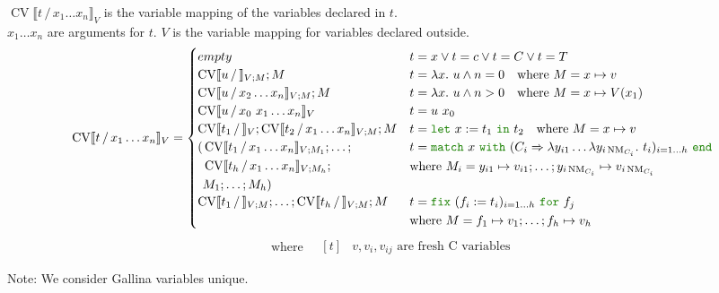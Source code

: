 \documentclass[a4paper,fleqn]{article}
\def\gallina{\textrm{Gallina}}
\newcommand{\kwlet}{\mbox{\color{mygreen}\ttfamily let}}
\newcommand{\kwin}{\mbox{\color{mygreen}\ttfamily in}}
\newcommand{\kwmatch}{\mbox{\color{mygreen}\ttfamily match}}
\newcommand{\kwwith}{\mbox{\color{mygreen}\ttfamily with}}
\newcommand{\kwend}{\mbox{\color{mygreen}\ttfamily end}}
\newcommand{\kwfix}{\mbox{\color{mygreen}\ttfamily fix}}
\newcommand{\kwfor}{\mbox{\color{mygreen}\ttfamily for}}
\newcommand{\lam}[2]{\lambda #1.~#2}
\newcommand{\lamB}[1]{\lambda #1.~}
\newcommand{\letin}[3]{\kwlet~#1:=#2~\kwin~#3}
\newcommand{\match}[4]{\kwmatch~#1~\kwwith~(#2 \Rightarrow #3)_{#4}~\kwend}
\newcommand{\fix}[4]{\kwfix~(#1 := #2)_{#3}~\kwfor~#4}
\DeclareMathOperator{\NM}{NM}
\newcommand{\BRA}[1]{\llbracket #1 \rrbracket}
\DeclareMathOperator{\cvop}{CV}
\newcommand{\cv}[3]{\cvop\BRA{#1\,/\,#2}_{#3}}
\begin{document}
\raggedright
$\cv{t}{x_1\dots x_n}{V}$ is the variable mapping of the variables declared in $t$. \\
$x_1\dots x_n$ are arguments for $t$.
$V$ is the variable mapping for variables declared outside.
\[
  \cv{t}{x_1\dots x_n}{V} =
  \begin{cases}
    empty                                             & t = x \vee t = c \vee t = C \vee t = T \\
    \cv{u}{}{V; M}; M                                & t = \lam{x}{u} \wedge n = 0 \quad \text{where}~M = x\mapsto v \\
    \cv{u}{x_2\dots x_n}{V; M}; M                    & t = \lam{x}{u} \wedge n > 0 \quad \text{where}~M = x\mapsto V(x_1) \\
    \cv{u}{x_0~x_1\dots x_n}V                        & t = u~x_0 \\
    \cv{t_1}{}{V}; \cv{t_2}{x_1\dots x_n}{V; M}; M    & t = \letin{x}{t_1}{t_2} \quad \text{where}~M = x\mapsto v \\
    \begin{aligned}[t]
      (&\cv{t_1}{x_1\dots x_n}{V;M_1};\dots; \\
       &\cv{t_h}{x_1\dots x_n}{V;M_h}; \\
       &M_1;\dots;M_h)
    \end{aligned} &                                   \begin{aligned}[t]
                                                        &t = \match{x}{C_i}{\lambda y_{i1}\dots\lamB{y_{i\NM_{C_i}}}t_i}{i=1\dots h} \\
                                                        &\text{where}~M_i = y_{i1}\mapsto v_{i1}; \dots; y_{i\NM_{C_i}}\mapsto v_{i\NM_{C_i}}
                                                      \end{aligned} \\
    \cv{t_1}{}{V;M}; \dots; \cv{t_h}{}{V;M}; M &    \begin{aligned}[t]
                                                        &t = \fix{f_i}{t_i}{i=1\dots h}{f_j} \\
                                                        &\text{where}~M = f_1\mapsto v_1;\dots; f_h\mapsto v_h
                                                      \end{aligned}
  \end{cases}
\]
\[ \text{where} \quad
  \begin{aligned}[t]
    & \text{$v, v_i, v_{ij}$ are fresh C variables}
  \end{aligned}
\]
\raggedright
{\small Note: \quad We consider \gallina{} variables unique.}
\end{document}
